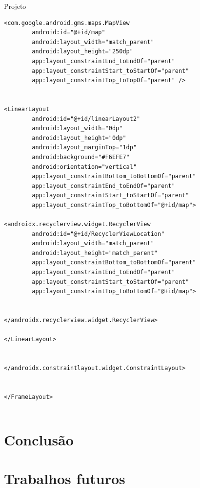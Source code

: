 \documentclass[
	12pt,				%
	openright,			%
	twoside,			%
	a4paper,			%
	english,			%
	french,				%
	spanish,			%
	brazil				%
	]{abntex2}
\begin{document}
\begin{chapter}{Projeto}
\begin{lstlisting}[numbers=none,basicstyle=\small,
caption={ActivityLocation.xml},
title={ActivityLocation.xml},
label={ActivityLocation.xml}]
<com.google.android.gms.maps.MapView
		android:id="@+id/map"
		android:layout_width="match_parent"
		android:layout_height="250dp"
		app:layout_constraintEnd_toEndOf="parent"
		app:layout_constraintStart_toStartOf="parent"
		app:layout_constraintTop_toTopOf="parent" />


<LinearLayout
		android:id="@+id/linearLayout2"
		android:layout_width="0dp"
		android:layout_height="0dp"
		android:layout_marginTop="1dp"
		android:background="#F6EFE7"
		android:orientation="vertical"
		app:layout_constraintBottom_toBottomOf="parent"
		app:layout_constraintEnd_toEndOf="parent"
		app:layout_constraintStart_toStartOf="parent"
		app:layout_constraintTop_toBottomOf="@+id/map">

<androidx.recyclerview.widget.RecyclerView
		android:id="@+id/RecyclerViewLocation"
		android:layout_width="match_parent"
		android:layout_height="match_parent"
		app:layout_constraintBottom_toBottomOf="parent"
		app:layout_constraintEnd_toEndOf="parent"
		app:layout_constraintStart_toStartOf="parent"
		app:layout_constraintTop_toBottomOf="@+id/map">


</androidx.recyclerview.widget.RecyclerView>

</LinearLayout>


</androidx.constraintlayout.widget.ConstraintLayout>


</FrameLayout>


\end{lstlisting}
\end{chapter}

\chapter{Conclusão}

\chapter{Trabalhos futuros}



\postextual

\end{document}

